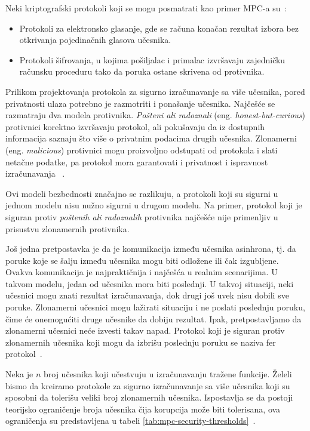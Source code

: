 Neki kriptografski protokoli koji se mogu posmatrati kao primer MPC-a su~\cite{smart2016cryptography}:

\begin{itemize}
    \item Protokoli za elektronsko glasanje, gde se računa konačan rezultat izbora bez otkrivanja pojedinačnih glasova učesnika.
    \item Protokoli šifrovanja, u kojima pošiljalac i primalac izvršavaju zajedničku računsku proceduru tako da poruka ostane skrivena od protivnika.
\end{itemize}

Prilikom projektovanja protokola za sigurno izračunavanje sa više učesnika, pored privatnosti ulaza potrebno je razmotriti i ponašanje učesnika. Najčešće se razmatraju dva modela protivnika. \emph{Pošteni ali radoznali} (eng. \textit{honest-but-curious}) protivnici korektno izvršavaju protokol, ali pokušavaju da iz dostupnih informacija saznaju što više o privatnim podacima drugih učesnika. Zlonamerni (eng. \textit{malicious}) protivnici mogu proizvoljno odstupati od protokola i slati netačne podatke, pa protokol mora garantovati i privatnost i ispravnost izračunavanja ~\cite{smart2016cryptography}.

Ovi modeli bezbednosti značajno se razlikuju, a protokoli koji su sigurni u jednom modelu nisu nužno sigurni u drugom modelu. Na primer, protokol koji je siguran protiv \emph{poštenih ali radoznalih} protivnika najčešće nije primenljiv u prisustvu zlonamernih protivnika.

Još jedna pretpostavka je da je komunikacija između učesnika asinhrona, tj. da poruke koje se šalju između učesnika mogu biti odložene ili čak izgubljene. Ovakva komunikacija je najpraktičnija i najčešća u realnim scenarijima. U takvom modelu, jedan od učesnika mora biti poslednji. U takvoj situaciji, neki učesnici mogu znati rezultat izračunavanja, dok drugi još uvek nisu dobili sve poruke. Zlonamerni učesnici mogu lažirati situaciju i ne poslati poslednju poruku, čime će onemogućiti druge učesnike da dobiju rezultat. Ipak, pretpostavljamo da zlonamerni učesnici neće izvesti takav napad. Protokol koji je siguran protiv zlonamernih učesnika koji mogu da izbrišu poslednju poruku se naziva fer protokol~\cite{smart2016cryptography}.

Neka je $n$ broj učesnika koji učestvuju u izračunavanju tražene funkcije. Želeli bismo da kreiramo protokole za sigurno izračunavanje sa više učesnika koji su sposobni da tolerišu veliki broj zlonamernih učesnika. Ispostavlja se da postoji teorijsko ograničenje broja učesnika čija korupcija može biti tolerisana, ova ograničenja su predstavljena u tabeli \ref{tab:mpc-security-thresholds}~\cite{smart2016cryptography}.

